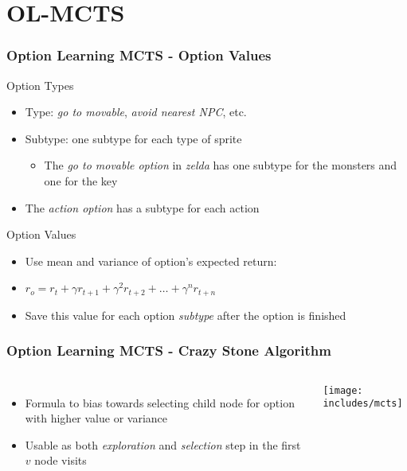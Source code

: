 \documentclass[aspectratio=169]{beamer}
\begin{document}
\section{OL-MCTS}
\begin{frame}
	\frametitle{Option Learning MCTS - Option Values}
	\begin{block}{Option Types}
		\begin{itemize}
			\item Type: \emph{go to movable}, \emph{avoid nearest NPC}, etc.
			\item Subtype: one subtype for each type of sprite
				\begin{itemize}
					\item The \emph{go to movable option} in \textit{zelda} has
						one subtype for the monsters and one for the key
				\end{itemize}
			\item The \emph{action option} has a subtype for each action
		\end{itemize}
	\end{block}
	\begin{block}{Option Values}
		\begin{itemize}
			\item Use mean and variance of option's expected return:
			\item $r_o = r_{t} + \gamma r_{t+1} + \gamma^2 r_{t+2} + \ldots + \gamma^n r_{t+n}$
			\item Save this value for each option \emph{subtype} after the option is finished
		\end{itemize}
	\end{block}
\end{frame}
\begin{frame}
	\frametitle{Option Learning MCTS - Crazy Stone Algorithm \cite{coulom2007efficient}}
	\begin{columns}
			\begin{itemize}
				\item Formula to bias towards selecting child node for option
					with higher value or variance
				\item Usable as both \emph{exploration} and \emph{selection}
					step in the first $v$ node visits
			\end{itemize}
			\centering
			\texttt{[image: includes/mcts]}
	\end{columns}
\end{frame}
\end{document}
